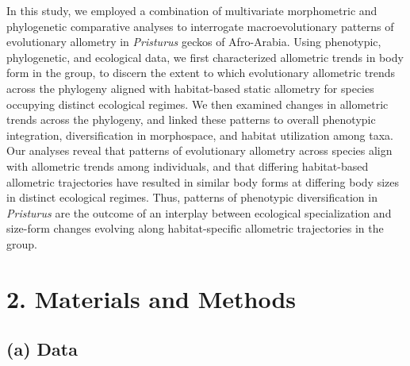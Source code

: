 \documentclass[
  11pt,
]{article}
\begin{document}
In this study, we employed a combination of multivariate morphometric
and phylogenetic comparative analyses to interrogate macroevolutionary
patterns of evolutionary allometry in \emph{Pristurus} geckos of
Afro-Arabia. Using phenotypic, phylogenetic, and ecological data, we
first characterized allometric trends in body form in the group, to
discern the extent to which evolutionary allometric trends across the
phylogeny aligned with habitat-based static allometry for species
occupying distinct ecological regimes. We then examined changes in
allometric trends across the phylogeny, and linked these patterns to
overall phenotypic integration, diversification in morphospace, and
habitat utilization among taxa. Our analyses reveal that patterns of
evolutionary allometry across species align with allometric trends among
individuals, and that differing habitat-based allometric trajectories
have resulted in similar body forms at differing body sizes in distinct
ecological regimes. Thus, patterns of phenotypic diversification in
\emph{Pristurus} are the outcome of an interplay between ecological
specialization and size-form changes evolving along habitat-specific
allometric trajectories in the group.

\hypertarget{materials-and-methods}{%
\section{2. Materials and Methods}\label{materials-and-methods}}

\hypertarget{a-data}{%
\subsection{(a) Data}\label{a-data}}
\end{document}
